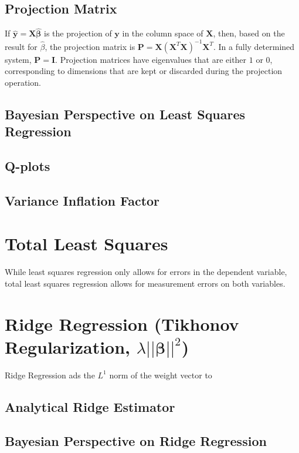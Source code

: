 \subsection{Projection Matrix}

If $\mathbf{\hat{y}}=\mathbf{X}\mathbf{\hat{\beta}}$ is the projection of $\mathbf{y}$ in the column space of $\mathbf{X}$, then, based on the result for $\hat{\beta}$, the projection matrix is $\mathbf{P} = \mathbf{X}\left(\mathbf{X}^T\mathbf{X}\right)^{-1}\mathbf{X}^T$. In a fully determined system, $\mathbf{P}=\mathbf{I}$. Projection matrices have eigenvalues that are either $1$ or $0$, corresponding to dimensions that are kept or discarded during the projection operation.


\subsection{Bayesian Perspective on Least Squares Regression}




\subsection{Q-plots}
\subsection{Variance Inflation Factor}

\section{Total Least Squares}
While least squares regression only allows for errors in the dependent variable, total least squares regression allows for measurement errors on both variables.

\section{Ridge Regression (Tikhonov Regularization, $\lambda ||\mathbf{\beta}||^2$)}
Ridge Regression ads the $L^1$ norm of the weight vector to 

\subsection{Analytical Ridge Estimator}
\subsection{Bayesian Perspective on Ridge Regression}

